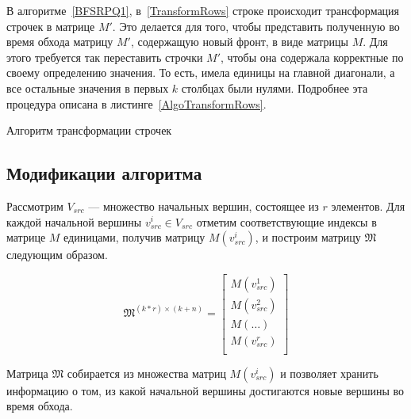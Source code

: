 В алгоритме~\ref{BFSRPQ1}, в~\ref{TransformRows} строке происходит трансформация строчек в матрице $M'$. Это делается для того, чтобы представить полученную во время обхода матрицу $M'$, содержащую новый фронт, в виде матрицы $M$. Для этого требуется так переставить строчки $M'$, чтобы она содержала корректные по своему определению значения. То есть, имела единицы на главной диагонали, а все остальные значения в первых $k$ столбцах были нулями. Подробнее эта процедура описана в листинге~\ref{AlgoTransformRows}.

\begin{algorithm}[H]
  \caption{Алгоритм трансформации строчек}\label{AlgoTransformRows}
  \begin{algorithmic}[1]
        \EndFor
    \EndProcedure
  \end{algorithmic}
\end{algorithm}

\pagebreak

\subsection{Модификации алгоритма}

Рассмотрим $V_{src}$ --- множество начальных вершин, состоящее из $r$ элементов. Для каждой начальной вершины $v_{src}^i \in V_{src}$ отметим соответствующие индексы в матрице $M$ единицами, получив матрицу $M(v_{src}^i)$,  и построим матрицу $\mathfrak{M}$ следующим образом.

\begin{equation}
\mathfrak{M}^{(k*r) \times (k + n)} =
  \left[
    \begin{matrix}
        M(v_{src}^1) \\
        M(v_{src}^2) \\ 
        M(\dots) \\
        M(v_{src}^r) \\
    \end{matrix}
  \right]
\end{equation}

Матрица $\mathfrak{M}$ собирается из множества матриц $M(v_{src}^i)$ и позволяет хранить информацию о том, из какой начальной вершины достигаются новые вершины во время обхода. 

